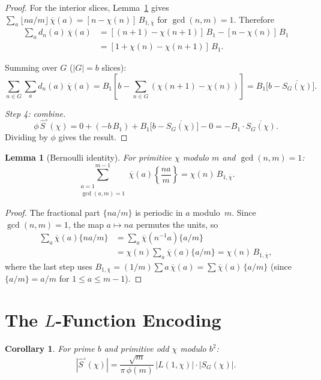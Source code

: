 \documentclass[12pt]{amsart}
\newtheorem{lemma}[theorem]{Lemma}
\newtheorem{corollary}[theorem]{Corollary}
\theoremstyle{definition}
\theoremstyle{remark}
\begin{document}
\begin{proof}
For the interior slices, Lemma~\ref{lem:bernoulli}
gives
$\sum_a \lfloor na/m \rfloor\, \overline{\chi}(a)
= [n - \chi(n)]\, B_{1,\overline{\chi}}$
for $\gcd(n, m) = 1$. Therefore
\begin{align*}
\sum_a d_n(a)\, \overline{\chi}(a)
&= [(n{+}1) - \chi(n{+}1)]\, B_1
- [n - \chi(n)]\, B_1 \\
&= [1 + \chi(n) - \chi(n{+}1)]\, B_1.
\end{align*}

Summing over $G$ ($|G| = b$ slices):
\[
\sum_{n \in G} \sum_a d_n(a)\, \overline{\chi}(a)
= B_1 \left[b - \sum_{n \in G}
(\chi(n{+}1) - \chi(n))\right]
= B_1 \bigl[b - \overline{S_G(\chi)}\bigr].
\]

\emph{Step 4: combine.}
\[
\phi\, \hat{S}^{\circ}(\chi)
= 0 + (-b\, B_1) + B_1\bigl[b -
\overline{S_G(\chi)}\bigr] - 0
= -B_1 \cdot \overline{S_G(\chi)}.
\]
Dividing by $\phi$ gives the result.
\end{proof}

\begin{lemma}[Bernoulli identity]\label{lem:bernoulli}\leavevmode\newline
For primitive $\chi$ modulo $m$ and $\gcd(n,m)=1$:
\[
\sum_{\substack{a = 1 \\ \gcd(a,m)=1}}^{m-1}
\overline{\chi}(a) \left\{\frac{na}{m}\right\}
= \chi(n)\, B_{1,\overline{\chi}}.
\]
\end{lemma}

\begin{proof}
The fractional part $\{na/m\}$ is periodic in $a$
modulo~$m$. Since $\gcd(n,m)=1$, the map
$a \mapsto na$ permutes the units, so
\begin{align*}
\sum_a \overline{\chi}(a)\{na/m\}
&= \sum_a \overline{\chi}(n^{-1}a)\{a/m\} \\
&= \chi(n)\sum_a \overline{\chi}(a)\{a/m\}
= \chi(n)\,B_{1,\overline{\chi}},
\end{align*}
where the last step uses
$B_{1,\overline{\chi}}
= (1/m)\sum a\,\overline{\chi}(a)
= \sum \overline{\chi}(a)\,\{a/m\}$
(since $\{a/m\}=a/m$ for $1 \le a \le m{-}1$).
\end{proof}

\section{The $L$-Function Encoding}

\begin{corollary}\label{cor:L-encoding}
For prime $b$ and primitive odd $\chi$ modulo $b^2$:
\[
|\hat{S}^{\circ}(\chi)|
= \frac{\sqrt{m}}{\pi\, \phi(m)}\,
|L(1, \chi)| \cdot |S_G(\chi)|.
\]
\end{corollary}
\end{document}
